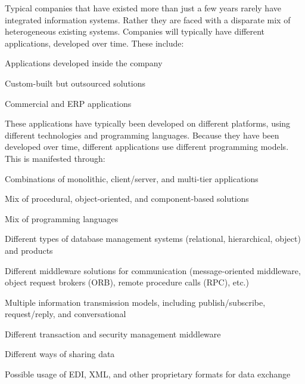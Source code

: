 Typical companies that have existed more than just a few years rarely have integrated information systems. Rather they are faced with a disparate mix of heterogeneous existing systems. Companies will typically have different applications, developed over time. These include:

\begin{compactenum}
\item  Applications developed inside the company

\item  Custom-built but outsourced solutions

\item  Commercial and ERP applications
\end{compactenum}

These applications have typically been developed on different platforms, using different technologies and programming languages. Because they have been developed over time, different applications use different programming models. This is manifested through:

\begin{compactenum}
\item  Combinations of monolithic, client/server, and multi-tier applications

\item  Mix of procedural, object-oriented, and component-based solutions

\item  Mix of programming languages

\item  Different types of database management systems (relational, hierarchical, object) and products

\item  Different middleware solutions for communication (message-oriented middleware, object request brokers (ORB), remote procedure calls (RPC), etc.)

\item  Multiple information transmission models, including publish/subscribe, request/reply, and conversational

\item  Different transaction and security management middleware

\item  Different ways of sharing data

\item  Possible usage of EDI, XML, and other proprietary formats for data exchange
\end{compactenum}

